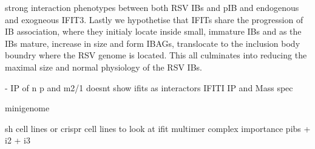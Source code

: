 strong interaction phenotypes between both RSV IBs and pIB and endogenous and exogneous IFIT3. Lastly we hypothetise that IFITs share the progression of IB association, where they initialy locate inside small, immature IBs and as the IBs mature, increase in size and form IBAGs, translocate to the inclusion body boundry where the RSV genome is located. This all culminates into reducing the maximal size and normal physiology of the RSV IBs.



\cite{Oliveira2013HumanCells} - IP of n p and m2/1 doesnt show ifits as interactors
IFITI IP and Mass spec

minigenome \cite{Teng2016UseTranscription}

sh cell lines or crispr cell lines to look at ifit multimer complex importance
pibs + i2 + i3


